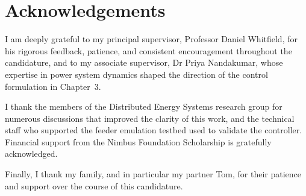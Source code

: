 \chapter*{Acknowledgements}

I am deeply grateful to my principal supervisor, Professor Daniel Whitfield, for his rigorous feedback, patience, and consistent encouragement throughout the candidature, and to my associate supervisor, Dr Priya Nandakumar, whose expertise in power system dynamics shaped the direction of the control formulation in Chapter~3.

I thank the members of the Distributed Energy Systems research group for numerous discussions that improved the clarity of this work, and the technical staff who supported the feeder emulation testbed used to validate the controller. Financial support from the Nimbus Foundation Scholarship is gratefully acknowledged.

Finally, I thank my family, and in particular my partner Tom, for their patience and support over the course of this candidature.

\tableofcontents
\listoffigures
\listoftables
